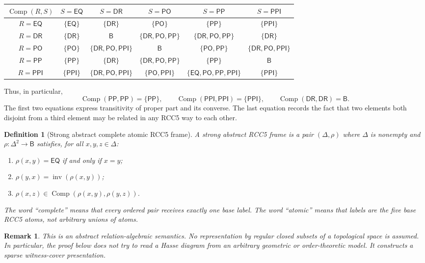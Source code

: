 \documentclass[11pt]{article}
\newtheorem{definition}[theorem]{Definition}
\newtheorem{remark}[theorem]{Remark}
\newcommand{\Base}{\mathsf B}
\newcommand{\EQ}{\mathsf{EQ}}
\newcommand{\DR}{\mathsf{DR}}
\newcommand{\PO}{\mathsf{PO}}
\newcommand{\PP}{\mathsf{PP}}
\newcommand{\PPI}{\mathsf{PPI}}
\newcommand{\Inv}{\operatorname{inv}}
\newcommand{\comp}{\operatorname{Comp}}
\begin{document}
\begin{center}
\renewcommand{\arraystretch}{1.18}
\begin{tabular}{c|ccccc}
\toprule
$\comp(R,S)$ & $S=\EQ$ & $S=\DR$ & $S=\PO$ & $S=\PP$ & $S=\PPI$ \\
\midrule
$R=\EQ$  & $\{\EQ\}$ & $\{\DR\}$ & $\{\PO\}$ & $\{\PP\}$ & $\{\PPI\}$ \\
$R=\DR$  & $\{\DR\}$ & $\Base$ & $\{\DR,\PO,\PP\}$ & $\{\DR,\PO,\PP\}$ & $\{\DR\}$ \\
$R=\PO$  & $\{\PO\}$ & $\{\DR,\PO,\PPI\}$ & $\Base$ & $\{\PO,\PP\}$ & $\{\DR,\PO,\PPI\}$ \\
$R=\PP$  & $\{\PP\}$ & $\{\DR\}$ & $\{\DR,\PO,\PP\}$ & $\{\PP\}$ & $\Base$ \\
$R=\PPI$ & $\{\PPI\}$ & $\{\DR,\PO,\PPI\}$ & $\{\PO,\PPI\}$ & $\{\EQ,\PO,\PP,\PPI\}$ & $\{\PPI\}$ \\
\bottomrule
\end{tabular}
\end{center}

Thus, in particular,
\[
  \comp(\PP,\PP)=\{\PP\},\qquad
  \comp(\PPI,\PPI)=\{\PPI\},\qquad
  \comp(\DR,\DR)=\Base.
\]
The first two equations express transitivity of proper part and its converse.  The last equation records the fact that two elements both disjoint from a third element may be related in any RCC5 way to each other.

\begin{definition}[Strong abstract complete atomic RCC5 frame]\label{def:frame}
A strong abstract RCC5 frame is a pair $(\Delta,\rho)$ where $\Delta$ is nonempty and $\rho:\Delta^2\to\Base$ satisfies, for all $x,y,z\in\Delta$:
\begin{enumerate}[label=(F\arabic*)]
\item $\rho(x,y)=\EQ$ if and only if $x=y$;
\item $\rho(y,x)=\Inv(\rho(x,y))$;
\item $\rho(x,z)\in\comp(\rho(x,y),\rho(y,z))$.
\end{enumerate}
The word ``complete'' means that every ordered pair receives exactly one base label.  The word ``atomic'' means that labels are the five base RCC5 atoms, not arbitrary unions of atoms.
\end{definition}

\begin{remark}
This is an abstract relation-algebraic semantics.  No representation by regular closed subsets of a topological space is assumed.  In particular, the proof below does not try to read a Hasse diagram from an arbitrary geometric or order-theoretic model.  It constructs a sparse witness-cover presentation.
\end{remark}
\end{document}
